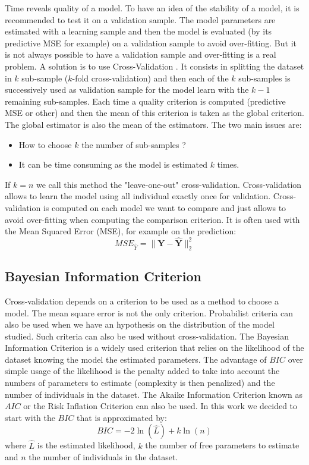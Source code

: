 \documentclass[12pt,a4paper]{report}
\begin{document}
				Time reveals quality of a model. To have an idea of the stability of a model, it is recommended to test it on a validation sample. The model parameters are estimated with a learning sample and then the model is evaluated (by its predictive MSE for example) on a validation sample to avoid over-fitting. But it is not always possible to have a validation sample and over-fitting is a real problem. A solution is to use Cross-Validation \cite{kohavi1995study,arlot2010survey}. It consists in splitting the dataset in $k$ sub-sample ($k$-fold cross-validation) and then each of the $k$ sub-samples is successively used as validation sample for the model learn with the $k-1$ remaining sub-samples. Each time a quality criterion  is computed (predictive MSE or other) and then the mean of this criterion is taken as the global criterion. The global estimator is also the mean of the estimators. The two main issues are:
				\begin{itemize}
					\item How to choose $k$ the number of sub-samples ?
					\item It can be time consuming as the model is estimated $k$ times.
				\end{itemize}
				If $k=n$ we call this method the "leave-one-out" cross-validation.
				Cross-validation allows to learn the model using all individual exactly once for validation.
				Cross-validation is computed on each model we want to compare and just allows to avoid over-fitting when computing the comparison criterion.
				It is often used with the Mean Squared Error (MSE), for example on the prediction:
				\begin{equation}
					MSE_{\hat{Y}}=\parallel \boldsymbol{Y}-\hat{\boldsymbol{Y}} \parallel^2_2
				\end{equation}
			\subsection{ Bayesian Information Criterion}
			Cross-validation depends on a criterion to be used as a method to choose a model. The mean square error is not the only criterion. Probabilist criteria can also be used when we have an hypothesis on the distribution of the model studied. Such criteria can also be used without cross-validation.
			The Bayesian Information Criterion \cite{BIChuard} is a widely used criterion that relies on the likelihood of the dataset knowing the model the estimated parameters. The advantage of $BIC$ over simple usage of the likelihood is the penalty added to take into account the numbers of parameters to estimate (complexity is then penalized) and the number of individuals in the dataset. The Akaike Information Criterion \cite{akaike1974new} known as $AIC$ or the Risk Inflation Criterion \cite{foster1994risk} can also be used.
			In this work we decided to start with the $BIC$ that is approximated by:
			\begin{equation}
				BIC=-2\ln(\hat{L})+k\ln(n)
			\end{equation}
			where $\hat{L}$ is the estimated likelihood, $k$ the number of free parameters to estimate and $n$ the number of individuals in the dataset.
\end{document}
